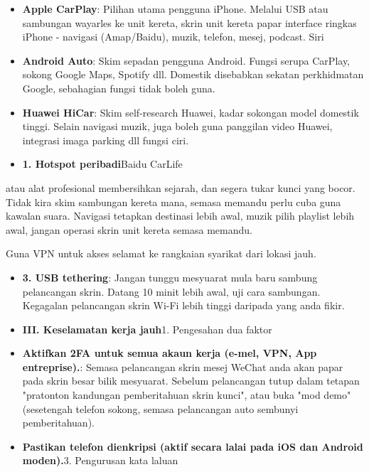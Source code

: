 \begin{itemize}
  \item \textbf{Apple CarPlay}: Pilihan utama pengguna iPhone. Melalui USB atau sambungan wayarles ke unit kereta, skrin unit kereta papar interface ringkas iPhone - navigasi (Amap/Baidu), muzik, telefon, mesej, podcast. Siri
  \item \textbf{Android Auto}: Skim sepadan pengguna Android. Fungsi serupa CarPlay, sokong Google Maps, Spotify dll. Domestik disebabkan sekatan perkhidmatan Google, sebahagian fungsi tidak boleh guna.
  \item \textbf{Huawei HiCar}: Skim self-research Huawei, kadar sokongan model domestik tinggi. Selain navigasi muzik, juga boleh guna panggilan video Huawei, integrasi imaga parking dll fungsi ciri.
  \item \textbf{1. Hotspot peribadi}Baidu CarLife
\end{itemize}

\begin{tcbwarn}{atau alat profesional membersihkan sejarah, dan segera tukar kunci yang bocor.}
Tidak kira skim sambungan kereta mana, semasa memandu perlu cuba guna kawalan suara. Navigasi tetapkan destinasi lebih awal, muzik pilih playlist lebih awal, jangan operasi skrin unit kereta semasa memandu.

\end{tcbwarn}


Guna VPN untuk akses selamat ke rangkaian syarikat dari lokasi jauh.

\begin{itemize}
  \item \textbf{3. USB tethering}: Jangan tunggu mesyuarat mula baru sambung pelancangan skrin. Datang 10 minit lebih awal, uji cara sambungan. Kegagalan pelancangan skrin Wi-Fi lebih tinggi daripada yang anda fikir.
  \item \textbf{III. Keselamatan kerja jauh}1. Pengesahan dua faktor
  \item \textbf{Aktifkan 2FA untuk semua akaun kerja (e-mel, VPN, App entreprise).}: Semasa pelancangan skrin mesej WeChat anda akan papar pada skrin besar bilik mesyuarat. Sebelum pelancangan tutup dalam tetapan "pratonton kandungan pemberitahuan skrin kunci", atau buka "mod demo" (sesetengah telefon sokong, semasa pelancangan auto sembunyi pemberitahuan).
  \item \textbf{Pastikan telefon dienkripsi (aktif secara lalai pada iOS dan Android moden).}3. Pengurusan kata laluan
\end{itemize}

